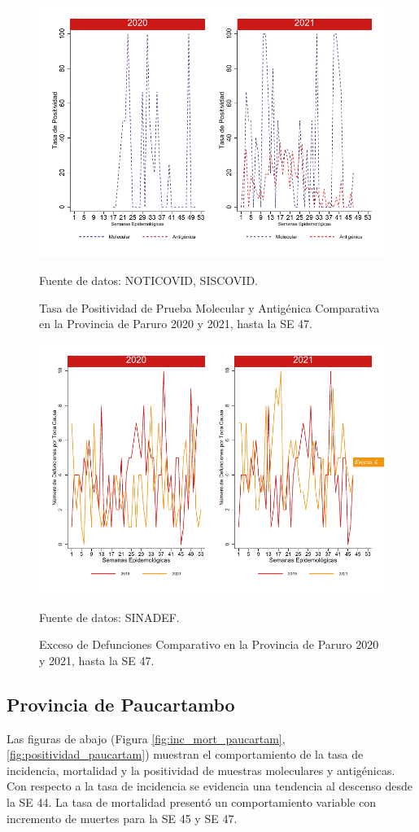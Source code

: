 \documentclass[12pt,a4paper,openany]{book}
\begin{document}
		\begin{figure}[h]
			\caption{Tasa de Positividad de Prueba Molecular y Antigénica Comparativa en la Provincia de Paruro 2020 y 2021, hasta la SE 47.}\label{fig:positividad_paruro}
			\begin{center}
				\includegraphics[width=0.7\linewidth]{../figuras/positividad_20_21_10}
			\end{center}
			{\footnotesize {Fuente de datos: NOTICOVID, SISCOVID.}}
		\end{figure}
		
		\begin{figure}[h]
			\caption{Exceso de Defunciones Comparativo en la Provincia de Paruro 2020 y 2021, hasta la SE 47.}\label{fig:exceso_paruro}
			\begin{center}
				\includegraphics[width=0.7\linewidth]{../figuras/exceso_10}
			\end{center}
			{\footnotesize {Fuente de datos: SINADEF.}}
		\end{figure}
		
		
		\clearpage
		
		\subsection*{Provincia de Paucartambo}
		\noindent Las figuras de abajo (Figura \ref{fig:inc_mort_paucartam}, \ref{fig:positividad_paucartam}) muestran el comportamiento de la tasa de incidencia, mortalidad y la positividad de muestras moleculares y antigénicas. Con respecto a la tasa de incidencia se evidencia una tendencia al descenso desde la SE 44. La tasa de mortalidad presentó un comportamiento variable con incremento de muertes para la SE 45 y SE 47.  
		
\end{document}
